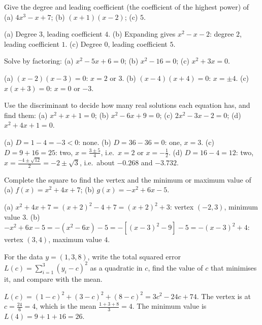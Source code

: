 \sectionexercises

\begin{exercise}
Give the degree and leading coefficient (the coefficient of the highest
power) of (a) $4x^3 - x + 7$; (b) $(x + 1)(x - 2)$; (c) $5$.
\end{exercise}
\begin{solution}
(a) Degree $3$, leading coefficient $4$. (b) Expanding gives $x^2 - x - 2$:
degree $2$, leading coefficient $1$. (c) Degree $0$, leading coefficient $5$.
\end{solution}

\begin{exercise}
Solve by factoring: (a) $x^2 - 5x + 6 = 0$; (b) $x^2 - 16 = 0$;
(c) $x^2 + 3x = 0$.
\end{exercise}
\begin{solution}
(a) $(x-2)(x-3) = 0$: $x = 2$ or $3$. (b) $(x-4)(x+4) = 0$: $x = \pm4$.
(c) $x(x+3) = 0$: $x = 0$ or $-3$.
\end{solution}

\begin{exercise}
Use the discriminant to decide how many real solutions each equation has, and
find them: (a) $x^2 + x + 1 = 0$; (b) $x^2 - 6x + 9 = 0$;
(c) $2x^2 - 3x - 2 = 0$; (d) $x^2 + 4x + 1 = 0$.
\end{exercise}
\begin{solution}
(a) $D = 1 - 4 = -3 < 0$: none. (b) $D = 36 - 36 = 0$: one, $x = 3$.
(c) $D = 9 + 16 = 25$: two, $x = \tfrac{3 \pm 5}{4}$, i.e.\ $x = 2$ or
$x = -\tfrac12$. (d) $D = 16 - 4 = 12$: two,
$x = \tfrac{-4 \pm\sqrt{12}}{2} = -2 \pm \sqrt3$, i.e.\ about $-0.268$ and
$-3.732$.
\end{solution}

\begin{exercise}
Complete the square to find the vertex and the minimum or maximum value of
(a) $f(x) = x^2 + 4x + 7$; (b) $g(x) = -x^2 + 6x - 5$.
\end{exercise}
\begin{solution}
(a) $x^2 + 4x + 7 = (x+2)^2 - 4 + 7 = (x+2)^2 + 3$: vertex $(-2, 3)$, minimum
value $3$. (b) $-x^2 + 6x - 5 = -(x^2 - 6x) - 5 = -[(x-3)^2 - 9] - 5 =
-(x-3)^2 + 4$: vertex $(3, 4)$, maximum value $4$.
\end{solution}

\begin{exercise}
For the data $y = (1, 3, 8)$, write the total squared error
$L(c) = \sum_{i=1}^3 (y_i - c)^2$ as a quadratic in $c$, find the value of $c$
that minimises it, and compare with the mean.
\end{exercise}
\begin{solution}
$L(c) = (1-c)^2 + (3-c)^2 + (8-c)^2 = 3c^2 - 24c + 74$. The vertex is at
$c = \tfrac{24}{6} = 4$, which is the mean $\tfrac{1 + 3 + 8}{3} = 4$. The
minimum value is $L(4) = 9 + 1 + 16 = 26$.
\end{solution}

